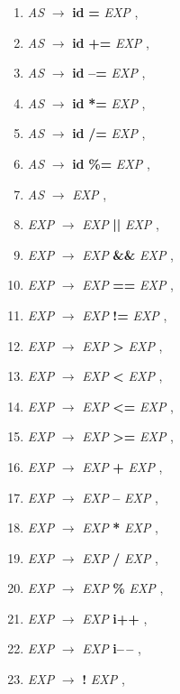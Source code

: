 \begin{enumerate}[label={\arabic*:}]
    \item \emph{AS} $\longrightarrow$ \textbf{id} \textbf{=} \emph{EXP} ,
    \item \emph{AS} $\longrightarrow$ \textbf{id} \textbf{+=} \emph{EXP} ,
    \item \emph{AS} $\longrightarrow$ \textbf{id} \textbf{--=} \emph{EXP} ,
    \item \emph{AS} $\longrightarrow$ \textbf{id} \textbf{*=} \emph{EXP} ,
    \item \emph{AS} $\longrightarrow$ \textbf{id} \textbf{/=} \emph{EXP} ,
    \item \emph{AS} $\longrightarrow$ \textbf{id} \textbf{\%=} \emph{EXP} ,
    \item \emph{AS} $\longrightarrow$ \emph{EXP} ,
    \item \emph{EXP} $\longrightarrow$ \emph{EXP} \textbf{||} \emph{EXP} ,
    \item \emph{EXP} $\longrightarrow$ \emph{EXP} \textbf{\&\&} \emph{EXP} ,
    \item \emph{EXP} $\longrightarrow$ \emph{EXP} \textbf{==} \emph{EXP} ,
    \item \emph{EXP} $\longrightarrow$ \emph{EXP} \textbf{!=} \emph{EXP} ,
    \item \emph{EXP} $\longrightarrow$ \emph{EXP} \textbf{>} \emph{EXP} ,
    \item \emph{EXP} $\longrightarrow$ \emph{EXP} \textbf{<} \emph{EXP} ,
    \item \emph{EXP} $\longrightarrow$ \emph{EXP} \textbf{<=} \emph{EXP} ,
    \item \emph{EXP} $\longrightarrow$ \emph{EXP} \textbf{>=} \emph{EXP} ,
    \item \emph{EXP} $\longrightarrow$ \emph{EXP} \textbf{+} \emph{EXP} ,
    \item \emph{EXP} $\longrightarrow$ \emph{EXP} \textbf{--} \emph{EXP} ,
    \item \emph{EXP} $\longrightarrow$ \emph{EXP} \textbf{*} \emph{EXP} ,
    \item \emph{EXP} $\longrightarrow$ \emph{EXP} \textbf{/} \emph{EXP} ,
    \item \emph{EXP} $\longrightarrow$ \emph{EXP} \textbf{\%} \emph{EXP} ,
    \item \emph{EXP} $\longrightarrow$ \emph{EXP} \textbf{i++} ,
    \item \emph{EXP} $\longrightarrow$ \emph{EXP} \textbf{i--\,--} ,
    \item \emph{EXP} $\longrightarrow$ \textbf{!} \emph{EXP} ,

\end{enumerate}
